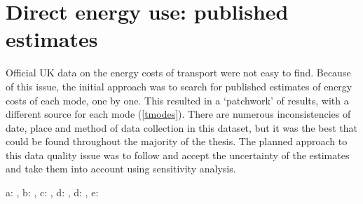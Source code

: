 \documentclass[a4paper, 11pt, twoside]{Thesis}
\begin{document}
\section{Direct energy use: published estimates} \label{sdirecte}
Official UK data on the energy costs of transport were not easy to find.
Because of this issue, the initial approach was to search for published
estimates of energy costs of each mode, one by one. This resulted in a
`patchwork' of results, with a different source for each mode (\cref{tmodes}).
There are numerous inconsistencies of date, place and method of data collection
in this dataset, but it was the best that could be found throughout the
majority of the thesis. The planned approach to this data quality issue was to
follow \citet{Lovelace2011-assessing} and accept the uncertainty of the estimates and
take them into account using sensitivity analysis. 

\begin{table}[t]
\caption{Direct energy use of selected modes}
\label{tmodes}
\begin{footnotesize}

\vspace{1cm}
 a: \citep{Coley2002}, b: \citep{Hansard2005}, c:
\citep{MacKay2009}, d: \citep{DfT2011-commuting}, d:
\citep{LondonUnderground2007}, e: \citep{ORNL2011}
\end{footnotesize} 
\end{table}
\end{document}
